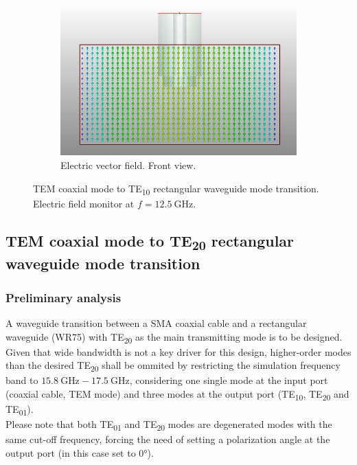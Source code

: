 \documentclass[english,twoside]{article}
\begin{document}
\begin{landscape}
\begin{figure}
\begin{subfigure}[b]{.7\textwidth}
					\includegraphics[width=\textwidth]{figures/coaxToWaveguide_front}
					\caption{Electric vector field. Front view.}
				\end{subfigure}
				\caption{TEM coaxial mode to TE\textsubscript{10} rectangular waveguide mode transition. Electric field monitor at $f=\SI{12.5}{\giga\hertz}$.}
				\label{fig:coaxToWaveguide_field}
			\end{figure}
		\end{landscape}
	
	\newpage
	\subsection{TEM coaxial mode to TE\textsubscript{20} rectangular waveguide mode transition}
		\subsubsection{Preliminary analysis}
		A waveguide transition between a \ac{SMA} coaxial cable and a rectangular waveguide (\ac{WR}75) with \ac{TE}\textsubscript{20} as the main transmitting mode is to be designed.\\	
		
		Given that wide bandwidth is not a key driver for this design, higher-order modes than the desired \ac{TE}\textsubscript{20} shall be ommited by restricting the simulation frequency band to $\SI{15.8}{\giga\hertz}-\SI{17.5}{\giga\hertz}$, considering one single mode at the input port (coaxial cable, \ac{TEM} mode) and three modes at the output port (\ac{TE}\textsubscript{10}, \ac{TE}\textsubscript{20} and \ac{TE}\textsubscript{01}).\\
		
		Please note that both \ac{TE}\textsubscript{01} and \ac{TE}\textsubscript{20} modes are degenerated modes with the same cut-off frequency, forcing the need of setting a polarization angle at the output port (in this case set to $\ang{0}$).
		
\end{document}
